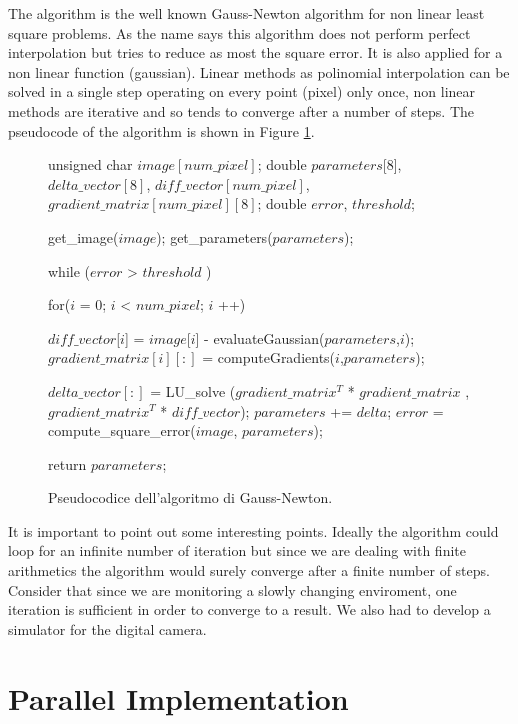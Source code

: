 The algorithm is the well known Gauss-Newton algorithm for non linear least square problems.
As the name says this algorithm does not perform perfect interpolation but tries to reduce as most the square error.
It is also applied for a non linear function (gaussian).
Linear methods as polinomial interpolation can be solved in a single step operating on every point (pixel) only once, non linear methods are iterative and so tends to converge after a  number of steps.
The pseudocode of the algorithm is shown in Figure \ref{code:gauss}.

\begin{figure}[h]
\begin{center} 
\begin{minipage}[c]{.85\textwidth} 
\centering 
\begin{pseudo}{}{}
unsigned char $image[num\_pixel]$;
double $parameters$[8], $delta\_vector[8]$, $diff\_vector[num\_pixel]$, $gradient\_matrix[num\_pixel][8]$;
double $error$, $threshold$;

get_image($image$);
get_parameters($parameters$);

while ($error$ > $threshold$ ) {
    for($i$ = 0; $i$ < $num\_pixel$; $i$ ++){
	
          $diff\_vector$[$i$] = $image$[$i$] - evaluateGaussian($parameters$,$i$); 
          $gradient\_matrix[i][:]$ = computeGradients($i$,$parameters$);
	      
    }
    
    $delta\_vector[:]$ = LU_solve ($gradient\_matrix^T$ * $gradient\_matrix$ , $gradient\_matrix^T$ * $diff\_vector$);
    $parameters$ += $delta$;
    $error$ = compute_square_error($image$, $parameters$);
}
return $parameters$;

\end{pseudo}
\end{minipage} 
\end{center} 
\caption{Pseudocodice dell'algoritmo di Gauss-Newton.}
\label{code:gauss}
\end{figure}

It is important to point out some interesting points.
Ideally the algorithm could loop for an infinite number of iteration but since we are dealing with finite arithmetics the algorithm would surely converge after a finite number of steps.
Consider that since we are monitoring a slowly changing enviroment, one iteration is sufficient in order to converge to a result.
We also had to develop a simulator for the digital camera.

\section{Parallel Implementation}